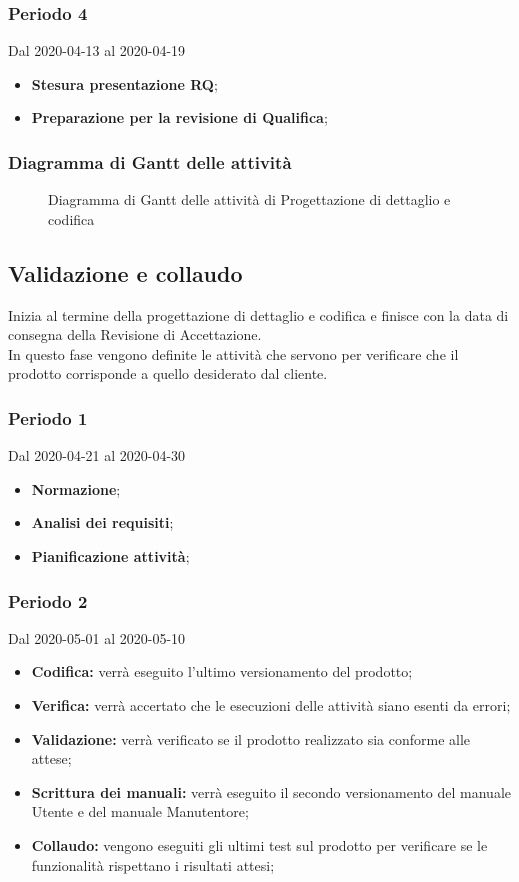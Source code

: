 \subsubsection{Periodo 4} 
Dal 2020-04-13 al 2020-04-19\\
\begin{itemize}
	\item \textbf{Stesura presentazione RQ};
	\item \textbf{Preparazione per la revisione di Qualifica};
\end{itemize}
\subsubsection{Diagramma di Gantt delle attività}
\begin{figure}[h]
	\caption{Diagramma di Gantt delle attività di Progettazione di dettaglio e codifica}
\end{figure}


\subsection{Validazione e collaudo}
Inizia al termine della progettazione di dettaglio e codifica e finisce con la data di consegna della Revisione di Accettazione.
\\In questo fase vengono definite le attività che servono per verificare che il prodotto corrisponde a quello desiderato dal cliente.
\subsubsection{Periodo 1} 
Dal 2020-04-21 al 2020-04-30
\begin{itemize}
	\item \textbf{Normazione};
	\item \textbf{Analisi dei requisiti};
	\item \textbf{Pianificazione attività};
\end{itemize}
\subsubsection{Periodo 2} 
Dal 2020-05-01 al 2020-05-10
\begin{itemize}
	\item \textbf{Codifica:} verrà eseguito l'ultimo versionamento del prodotto;
	\item \textbf{Verifica:} verrà accertato che le esecuzioni delle attività siano esenti da errori;
	\item \textbf{Validazione:} verrà verificato se il prodotto realizzato sia conforme alle attese;
	\item \textbf{Scrittura dei manuali:} verrà eseguito il secondo versionamento del manuale Utente e del manuale Manutentore;
	\item \textbf{Collaudo:} vengono eseguiti gli ultimi test sul prodotto per verificare se le funzionalità rispettano i risultati attesi;
\end{itemize}
